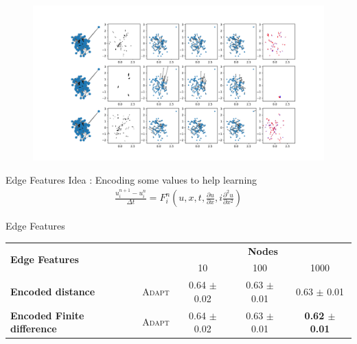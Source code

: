 \documentclass[aspectratio=169]{beamer}
\begin{document}
\begin{frame}
    \begin{figure}[htbp]
        \centering
        \includegraphics[width=\textwidth]{../results/pdfs/ba-100N-noemb0.pdf}
    \end{figure}
\end{frame}

\begin{frame}{Edge Features}
    \centering
    Idea : Encoding some values to help learning
    \begin{align*}
        \frac{u_{i}^{n + 1} - u_i^{n}}{\Delta t} = F_{i}^{n}(u,x,t, \frac{\partial u}{\partial x}, i\frac{\partial^2 u}{\partial x^{2}}    )
    \end{align*}
\end{frame}

\begin{frame}{Edge Features}
    \centering
    \begin{tabular}{lcccc} \toprule
        \multirow{2}{*}{\textbf{Edge Features}} &                            & \multicolumn{3}{c}{\textbf{Nodes}}                                                          \\ \cmidrule(lr){3-5}
                                                &                            & 10                                 & 100                   & 1000                           \\ \hline
        \textbf{Encoded distance}               & \scriptsize \textsc{Adapt} & 0.64 \tiny $\pm$ 0.02              & 0.63 \tiny $\pm$ 0.01 & 0.63 \tiny $\pm$ 0.01          \\
        \textbf{Encoded Finite difference}      & \scriptsize \textsc{Adapt} & 0.64 \tiny $\pm$ 0.02              & 0.63 \tiny $\pm$ 0.01 & \textbf{0.62 \tiny $\pm$ 0.01} \\ \hline
        \bottomrule
    \end{tabular}
\end{frame}
\end{document}
